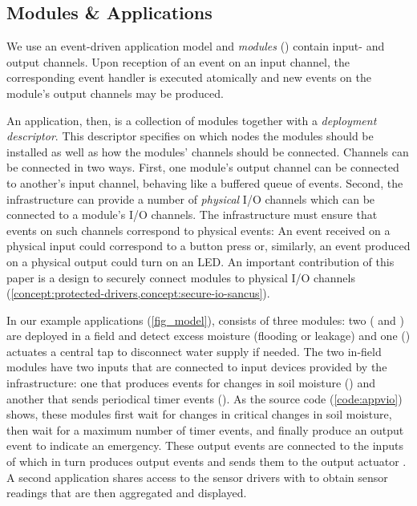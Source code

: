 

\subsection{Modules \& Applications}
%
We use an event-driven application model and \emph{modules} () contain
input- and output channels. Upon reception of an event on an input channel, the
corresponding event handler is executed atomically and new events on the
module's output channels may be produced.

An application, then, is a collection of modules together with a
\emph{deployment descriptor}. This descriptor specifies on which nodes the
modules should be installed as well as how the modules' channels should be
connected. Channels can be connected in two ways. First, one module's output
channel can be connected to another's input channel, behaving like a buffered
queue of events. Second, the infrastructure can provide a number of
\emph{physical} I/O channels which can be connected to a module's I/O channels.
\label{concept:physical-io-channel}
The infrastructure must ensure that events on such channels correspond to
physical events: An event received on a physical input could correspond to a
button press or, similarly, an event produced on a physical output could turn on
an LED. An important contribution of this paper is a design to securely connect
modules to physical I/O channels
(\cref{concept:protected-drivers,concept:secure-io-sancus}).

In our example applications (\cref{fig_model}), \appvio{} consists of three
modules: two ( and ) are deployed
in a field and detect excess moisture (flooding or leakage) and one
() actuates a central tap to disconnect water supply if
needed. The two in-field modules have two inputs that are connected to input
devices provided by the infrastructure: one that produces events for changes in
soil moisture () and another that sends periodical timer events
(). As the source code (\cref{code:appvio}) shows, these modules first
wait for changes in critical changes in soil moisture, then wait for a maximum
number of timer events, and finally produce an output event to indicate an
emergency. These output events are connected to the inputs of
 which in turn produces output events  and sends them to
the output actuator . A second application \appavl{} shares access to the
sensor drivers with \appvio{} to obtain sensor readings that are then aggregated
and displayed.

